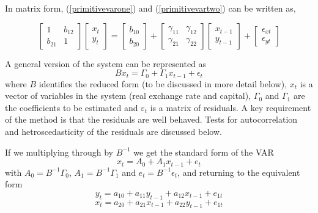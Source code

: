 \documentclass[jrfm,article,accept,moreauthors,pdftex]{Definitions/mdpi}
\begin{document}
In matrix form, (\ref{primitivevarone}) and (\ref{primitivevartwo}) can be written as, 

\begin{equation}
\label{transitionvar2}
\begin{bmatrix}
 1 & b_{12}\\
 b_{21} & 1
\end{bmatrix}
\begin{bmatrix}
x_{t}\\
y_{t}
\end{bmatrix}=
\begin{bmatrix}
b_{10}\\
b_{20}
\end{bmatrix}+
\begin{bmatrix}
\gamma_{11} & \gamma_{12}\\
\gamma_{21} & \gamma_{22}
\end{bmatrix}
\begin{bmatrix}
x_{t-1}\\
y_{t-1}
\end{bmatrix}+
\begin{bmatrix}
\epsilon_{xt}\\
\epsilon_{yt}
\end{bmatrix}
\end{equation}


A general version of the system can be represented as 
\begin{equation}\label{transitionvar}
Bx_{t}=\Gamma_{0}+\Gamma_{1}x_{t-1}+\epsilon_{t}
\end{equation}
where $B$ identifies the reduced form (to be discussed in more detail below), $x_t$ is a vector of variables in the system (real exchange rate and capital), $\Gamma_{0}$ and $\Gamma_{1}$ are the coefficients to be estimated and $\varepsilon_t$ is a matrix of residuals. A key requirement of the method is that the residuals are well behaved.  Tests for autocorrelation and hetroscedasticity of the residuals are discussed below. 

If we multiplying through by $B^{-1}$ we get the {standard form of the VAR}
\begin{equation}\label{standardvar}
x_t=A_0+A_1x_{t-1}+e_t
\end{equation}
with $A_0=B^{-1}\Gamma_0$, $A_1=B^{-1}\Gamma_1$ and $e_t=B^{-1}\epsilon_t$, 
and returning to the equivalent form
\begin{equation}\label{standardvarone}
y_t=a_{10}+a_{11}y_{t-1}+a_{12}x_{t-1}+e_{1t}\end{equation}
\begin{equation}\label{standardvartwo}
x_{t}=a_{20}+a_{21}x_{t-1}+a_{22}y_{t-1}+e_{1t}
\end{equation}
\end{document}
